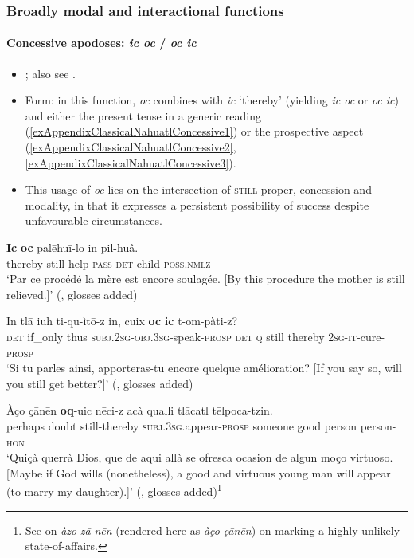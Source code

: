\largerpage[2.25]
\subsubsection{Broadly modal and interactional functions}
\paragraph{Concessive apodoses: \textit{ic oc} / \textit{oc ic}}
\label{appendixClassicalNahuatlConcessiveConsequent}
\begin{itemize}
	\item \textcite[1264]{Launey1986}; also see \textcite[307]{vanBaar1997}.
	\item Form: in this function, \textit{oc} combines with \textit{ic} \lq thereby' (yielding \textit{ic oc} or \textit{oc ic}) and either the present tense in a generic reading (\ref{exAppendixClassicalNahuatlConcessive1}) or the prospective aspect (\ref{exAppendixClassicalNahuatlConcessive2}, \ref{exAppendixClassicalNahuatlConcessive3}).
	\item This usage of \textit{oc} lies on the intersection of \textsc{still} proper, concession and modality, in that it expresses a persistent possibility of success despite unfavourable circumstances.
\end{itemize}
\begin{exe}
	\ex\label{exAppendixClassicalNahuatlConcessive1}
	\gll \textbf{Ic} \textbf{oc} palēhuī-lo in pil-huâ.\\
	thereby still help-\textsc{pass} \textsc{det} child-\textsc{poss}.\textsc{nmlz}\\
	\glt \lq Par ce procédé la mère est encore soulagée. [By this procedure the mother is still relieved.]' (\cite[1265]{Launey1986}, glosses added)

	\ex\label{exAppendixClassicalNahuatlConcessive2}
	\gll In tlā iuh ti-qu-ìtō-z in, cuix \textbf{oc} \textbf{ic} t-om-pàti-z?\\
	\textsc{det} if\_only thus \textsc{subj}.2\textsc{sg}-\textsc{obj}.3\textsc{sg}-speak-\textsc{prosp} \textsc{det} \textsc{q} still thereby 2\textsc{sg}-\textsc{it}-cure-\textsc{prosp}\\
	\glt \lq Si tu parles ainsi, apporteras-tu encore quelque amélioration? [If you say so, will you still  get better?]' (\cite[1265]{Launey1986}, glosses added)
	
	\ex\label{exAppendixClassicalNahuatlConcessive3}
	\gll Àço çānēn \textbf{oq}-uic nēci-z acà qualli tlācatl tēlpoca-tzin.\\
	perhaps doubt still-thereby \textsc{subj}.3\textsc{sg}.appear-\textsc{prosp} someone good person person-\textsc{hon}\\
	\glt \lq Quiçà querrà Dios, que de aqui allà se ofresca ocasion de algun moço virtuoso. [Maybe if God wills (nonetheless), a good and virtuous young man will appear (to marry my daughter).]\rq{ }(\cite[517]{Carochi1645}, glosses added)\footnote{See \textcite[1245]{Launey1986} on \textit{àzo} \textit{zā} \textit{nēn} (rendered here as \textit{àço} \textit{çānēn}) on marking a highly unlikely state-of-affairs.}
\end{exe}


